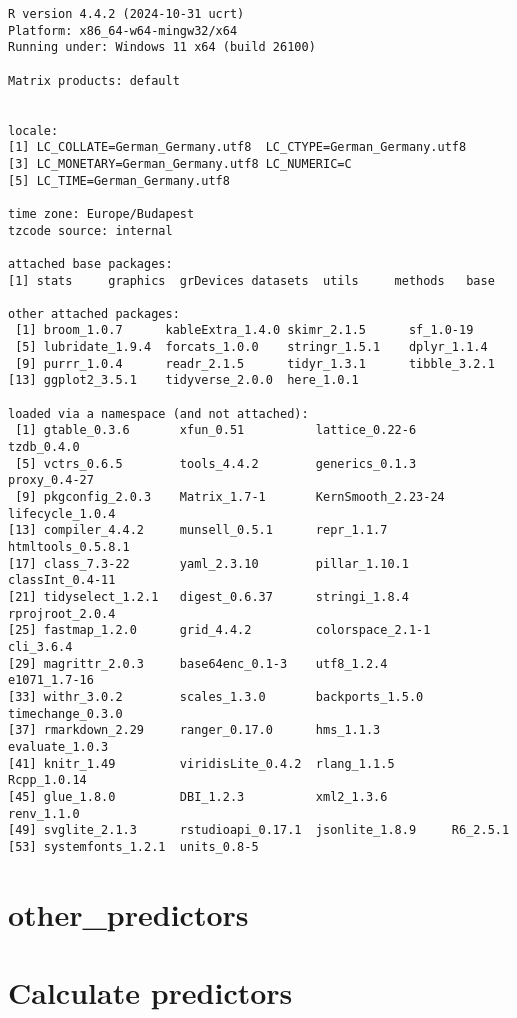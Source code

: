 \documentclass[
  letterpaper,
  DIV=11,
  numbers=noendperiod]{scrreprt}
\begin{document}
\begin{verbatim}
R version 4.4.2 (2024-10-31 ucrt)
Platform: x86_64-w64-mingw32/x64
Running under: Windows 11 x64 (build 26100)

Matrix products: default


locale:
[1] LC_COLLATE=German_Germany.utf8  LC_CTYPE=German_Germany.utf8
[3] LC_MONETARY=German_Germany.utf8 LC_NUMERIC=C
[5] LC_TIME=German_Germany.utf8

time zone: Europe/Budapest
tzcode source: internal

attached base packages:
[1] stats     graphics  grDevices datasets  utils     methods   base

other attached packages:
 [1] broom_1.0.7      kableExtra_1.4.0 skimr_2.1.5      sf_1.0-19
 [5] lubridate_1.9.4  forcats_1.0.0    stringr_1.5.1    dplyr_1.1.4
 [9] purrr_1.0.4      readr_2.1.5      tidyr_1.3.1      tibble_3.2.1
[13] ggplot2_3.5.1    tidyverse_2.0.0  here_1.0.1

loaded via a namespace (and not attached):
 [1] gtable_0.3.6       xfun_0.51          lattice_0.22-6     tzdb_0.4.0
 [5] vctrs_0.6.5        tools_4.4.2        generics_0.1.3     proxy_0.4-27
 [9] pkgconfig_2.0.3    Matrix_1.7-1       KernSmooth_2.23-24 lifecycle_1.0.4
[13] compiler_4.4.2     munsell_0.5.1      repr_1.1.7         htmltools_0.5.8.1
[17] class_7.3-22       yaml_2.3.10        pillar_1.10.1      classInt_0.4-11
[21] tidyselect_1.2.1   digest_0.6.37      stringi_1.8.4      rprojroot_2.0.4
[25] fastmap_1.2.0      grid_4.4.2         colorspace_2.1-1   cli_3.6.4
[29] magrittr_2.0.3     base64enc_0.1-3    utf8_1.2.4         e1071_1.7-16
[33] withr_3.0.2        scales_1.3.0       backports_1.5.0    timechange_0.3.0
[37] rmarkdown_2.29     ranger_0.17.0      hms_1.1.3          evaluate_1.0.3
[41] knitr_1.49         viridisLite_0.4.2  rlang_1.1.5        Rcpp_1.0.14
[45] glue_1.8.0         DBI_1.2.3          xml2_1.3.6         renv_1.1.0
[49] svglite_2.1.3      rstudioapi_0.17.1  jsonlite_1.8.9     R6_2.5.1
[53] systemfonts_1.2.1  units_0.8-5
\end{verbatim}


\hypertarget{other_predictors}{%
\chapter{other\_predictors}\label{other_predictors}}


\hypertarget{calculate-predictors}{%
\chapter{Calculate predictors}\label{calculate-predictors}}
\end{document}
